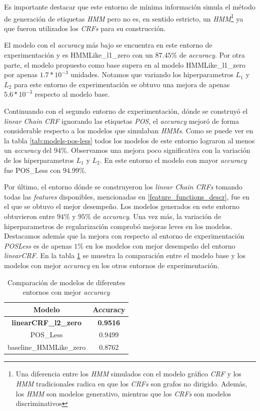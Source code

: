 \documentclass[letterpaper,12pt,oneside]{book}
\newcommand{\note}[4][]{\todo[author=#2,color=#3,size=\scriptsize,fancyline,caption={},#1]{#4}} %
\newcommand{\diego}[2][]{\note[#1]{Diego}{blue!40}{#2}}
\theoremstyle{definition}
\begin{document}
Es importante destacar que este entorno de mínima información simula el método de generación de etiquetas \textit{HMM} pero no es, en sentido estricto, un \textit{HMM}\footnote{Una diferencia entre los \textit{HMM} simulados con el modelo gráfico \textit{CRF} y los \textit{HMM} tradicionales radica en que los \textit{CRFs} son grafos no dirigido. Además, los \textit{HMM} son modelos generativo, mientras que los \textit{CRFs} son modelos discriminativos}
\diego{referencia} ya que fueron utilizados los \textit{CRFs} para su construcción.

El modelo con el \textit{accuracy} más bajo se encuentra en este entorno de experimentación y es \textsf{HMMLike\_l1\_zero} con un $87.45\%$ de \textit{accuracy}. Por otra parte, el modelo propuesto como base supera en al modelo \textsf{HMMLike\_l1\_zero} por apenas $1.7*10^{-3}$ unidades. Notamos que variando los hiperparametros $L_1$ y $L_2$ para este entorno de experimentación se obtuvo una mejora de apenas $5.6*10^{-3}$ respecto al modelo base. 

Continuando con el segundo entorno de experimentación, dónde se construyó el \textit{linear Chain CRF} ignorando las etiquetas \textit{POS}, el \textit{accuracy} mejoró de forma considerable respecto a los modelos que simulaban \textit{HMMs}. Como se puede ver en la tabla \ref{tab:models-pos-less} todos los modelos de este entorno lograron al menos un \textit{accuracy} del $94\%$. Observamos una mejora poco significativa con la variación de los hiperparametros $L_1$ y $L_2$. En este entorno el modelo con mayor \textit{accuracy} fue \textsf{POS\_Less} con $94.99\%$. 

Por último, el entorno dónde se construyeron los \textit{linear Chain CRFs} tomando todas las \textit{features} disponibles, mencionadas en \ref{feature_functions_descr}, fue en el que se obtuvo el mejor desempeño. Los modelos generados en este entorno obtuvieron entre $94\%$ y $95\%$ de \textit{accuracy}. Una vez más, la variación de hiperparametros de regularización comprobó mejoras leves en los modelos. Destacamos además que la mejora con respecto al entorno de experimentación \textit{POSLess} es de apenas $1\%$ en los modelos con mejor desempeño del entorno \textit{linearCRF}. En la tabla \ref{tab:models-comparation} se muestra la comparación entre el modelo base y los modelos con mejor \textit{accuracy} en los otros entornos de experimentación.

\begin{table}[ht]
    \centering
    \begin{tabular}{| c | c |}\hline
        \textbf{Modelo} & \textbf{Accuracy} \\\hline
        \textbf{\textsf{linearCRF\_l2\_zero}} & \textbf{0.9516}\\ 
        \textsf{POS\_Less} & 0.9499\\ 
        \textsf{baseline\_HMMLike\_zero} & 0.8762\\ \hline
    \end{tabular}
    \caption{Comparación de modelos de diferentes entornos con mejor \textit{accuracy}}
    \label{tab:models-comparation}
\end{table}  
\end{document}
